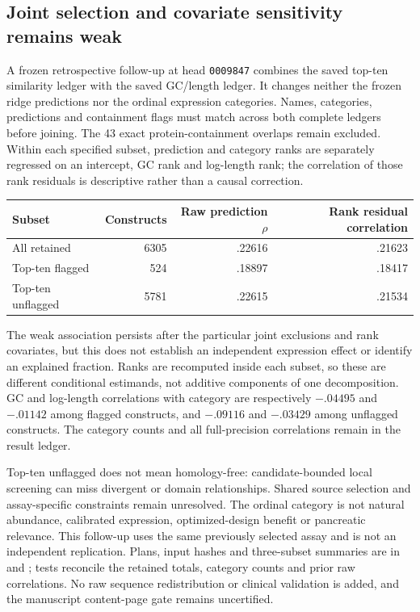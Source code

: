 \subsection{Joint selection and covariate sensitivity remains weak}
A frozen retrospective follow-up at head \texttt{0009847} combines the saved top-ten similarity ledger with the saved GC/length ledger. It changes neither the frozen ridge predictions nor the ordinal expression categories. Names, categories, predictions and containment flags must match across both complete ledgers before joining. The 43 exact protein-containment overlaps remain excluded. Within each specified subset, prediction and category ranks are separately regressed on an intercept, GC rank and log-length rank; the correlation of those rank residuals is descriptive rather than a causal correction.

\begin{center}
\begin{tabular}{lrrr}
\hline
Subset & Constructs & Raw prediction $\rho$ & Rank residual correlation\\
\hline
All retained & 6305 & .22616 & .21623\\
Top-ten flagged & 524 & .18897 & .18417\\
Top-ten unflagged & 5781 & .22615 & .21534\\
\hline
\end{tabular}
\end{center}

The weak association persists after the particular joint exclusions and rank covariates, but this does not establish an independent expression effect or identify an explained fraction. Ranks are recomputed inside each subset, so these are different conditional estimands, not additive components of one decomposition. GC and log-length correlations with category are respectively $-.04495$ and $-.01142$ among flagged constructs, and $-.09116$ and $-.03429$ among unflagged constructs. The category counts and all full-precision correlations remain in the result ledger.

Top-ten unflagged does not mean homology-free: candidate-bounded local screening can miss divergent or domain relationships. Shared source selection and assay-specific constraints remain unresolved. The ordinal category is not natural abundance, calibrated expression, optimized-design benefit or pancreatic relevance. This follow-up uses the same previously selected assay and is not an independent replication. Plans, input hashes and three-subset summaries are in  and ; tests reconcile the retained totals, category counts and prior raw correlations. No raw sequence redistribution or clinical validation is added, and the manuscript content-page gate remains uncertified.
